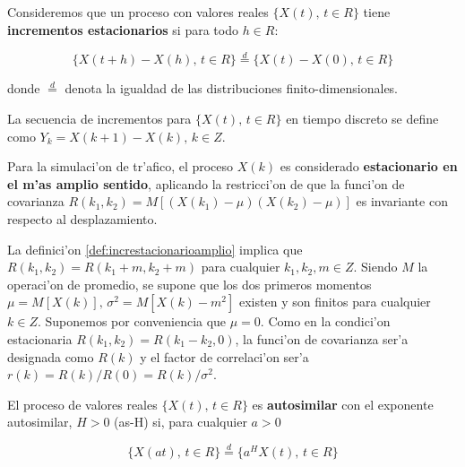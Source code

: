 \begin{definicion} \label{def:increstacionario}
Consideremos que un proceso con valores reales $\{X(t) \text{,  } t \in R\}$ 
tiene {\bf incrementos estacionarios} si para todo $h \in R$:

\begin{equation} \label{def:stationaryincrements}
\{X(t + h) - X(h) \text{,  } t \in R \} \stackrel{d}{=} \{X(t) - X(0) \text{,  } t \in R \}
\end{equation}

donde $\stackrel{d}{=}$ denota la igualdad de las distribuciones
finito-dimensionales.
\end{definicion}

La secuencia de incrementos para $\{ X(t) \text{, } t \in R \}$ en tiempo
discreto se define como $Y_k = X(k + 1) - X(k) \text{, } k \in Z$.

\begin{definicion} \label{def:increstacionarioamplio}
Para la simulaci'on de tr'afico, el proceso $X(k)$ es considerado {\bf
estacionario en el m'as amplio sentido}, aplicando la restricci'on de que la
funci'on de covarianza $R(k_1, k_2) = M [(X(k_1) - \mu)(X(k_2) -\mu)]$ es
invariante con respecto al desplazamiento.
\end{definicion}

La definici'on \ref{def:increstacionarioamplio} implica que
$R(k_1,k_2) = R(k_1 + m, k_2 + m)$ para cualquier $k_1, k_2, m \in Z$. Siendo
$M$ la operaci'on de promedio, se supone que los dos primeros momentos
$\mu = M[X(k)] \text{, } \sigma^2 = M[X(k) - m^2]$ existen y son finitos para
cualquier $k \in Z$. Suponemos por conveniencia que $\mu = 0$. Como en la
condici'on estacionaria $R(k_1,k_2) = R(k_1 - k_2, 0)$, la funci'on de
covarianza ser'a designada como $R(k)$ y el factor de correlaci'on ser'a
$r(k) = R(k)/R(0) = R(k)/\sigma^2$.

\begin{definicion} \label{def:ash}
El proceso de valores reales $\{X(t) \text{, } t \in R\}$ es {\bf autosimilar}
con el exponente autosimilar, $H > 0$ (as-H) si, para cualquier $a > 0$

\begin{equation} \label{eq:timespacechange}
\{X(at) \text{,  } t \in R\} \stackrel{d}{=} \{a^HX(t) \text{,  } t \in R\}
\end{equation}
\end{definicion}

